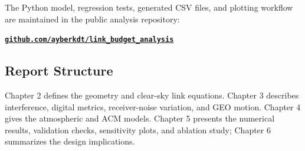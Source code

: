 \begin{tcolorbox}[
    enhanced,
    colback=repoBackground,
    colframe=repoAccent,
    colbacktitle=darkBlue,
    coltitle=white,
    title=Reproducible Analysis Package,
    fonttitle=\bfseries,
    boxrule=0.75pt,
    leftrule=3.0pt,
    arc=1.8pt,
    drop fuzzy shadow,
    left=6pt,
    right=6pt,
    top=5pt,
    bottom=5pt
]
\small
The Python model, regression tests, generated CSV files, and plotting workflow are maintained in the public analysis repository:
\begin{center}
    \href{https://github.com/ayberkdt/link_budget_analysis}{\textbf{\texttt{github.com/ayberkdt/link\_budget\_analysis}}}
\end{center}
\end{tcolorbox}

\subsection{Report Structure}
Chapter 2 defines the geometry and clear-sky link equations. Chapter 3 describes interference, digital metrics, receiver-noise variation, and GEO motion. Chapter 4 gives the atmospheric and ACM models. Chapter 5 presents the numerical results, validation checks, sensitivity plots, and ablation study; Chapter 6 summarizes the design implications.
